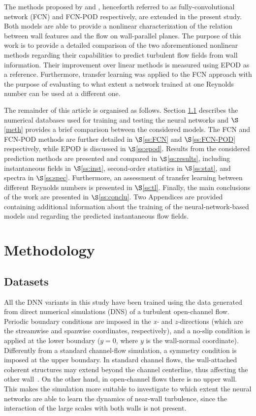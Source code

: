 The methods proposed by \citet{guastoni2020prediction} and \citet{guemes2019sensing}, henceforth referred to as fully-convolutional network (FCN) and FCN-POD respectively, are extended in the present study.
Both models are able to provide a nonlinear characterization of the relation between wall features and the flow on wall-parallel planes.
The purpose of this work is to provide a detailed comparison of the two aforementioned nonlinear methods regarding their capabilities to predict turbulent flow fields from wall information.
Their improvement over linear methods is measured using EPOD as a reference. Furthermore, transfer learning was applied to the FCN approach  with the purpose of evaluating to what extent a network trained at one Reynolds number can be used at a different one.

The remainder of this article is organised as follows.
Section \ref{datasets} describes the numerical databases used for training and testing the neural networks and $\S$\ref{meth} provides a brief comparison between the considered models.
The FCN and FCN-POD methods are further detailed in $\S$\ref{ss:FCN} and $\S$\ref{ss:FCN-POD} respectively, while EPOD is discussed in $\S$\ref{ss:epod}.
Results from the considered prediction methods are presented and compared in $\S$\ref{ss:results}, including instantaneous fields in $\S$\ref{ss:inst}, second-order statistics in $\S$\ref{ss:stat}, and spectra in $\S$\ref{ss:spec}.
Furthermore, an assessment of transfer learning between different Reynolds numbers is presented in $\S$\ref{ss:tl}.
Finally, the main conclusions of the work are presented in $\S$\ref{ss:conclu}.
Two Appendices are provided containing additional information about the training of the neural-network-based models and regarding the predicted instantaneous flow fields.

\section{Methodology}\label{s:methodology}
\subsection{Datasets}\label{datasets}
All the DNN variants in this study have been trained using the data generated from direct numerical simulations (DNS) of a turbulent open-channel flow.
Periodic boundary conditions are imposed in the \textit{x-} and \textit{z-}directions (which are the streamwise and spanwise coordinates, respectively), and a no-slip condition is applied at the lower boundary ($y=0$, where $y$ is the wall-normal coordinate).
Differently from a standard channel-flow simulation, a symmetry condition is imposed at the upper boundary.
In standard channel flows, the wall-attached coherent structures may extend beyond the channel centerline, thus affecting the other wall~\citep{lozano2012three}.
On the other hand, in open-channel flows there is no upper wall.
This makes the simulation more suitable to investigate to which extent the neural networks are able to learn the dynamics of near-wall turbulence, since the interaction of the large scales with both walls is not present.


